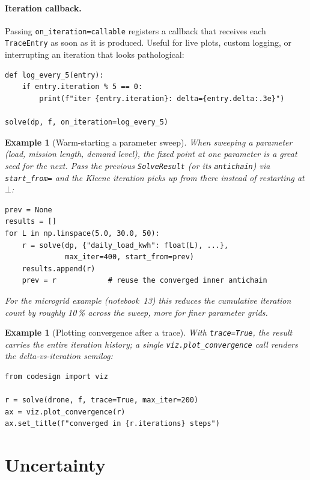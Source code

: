 \documentclass[11pt,a4paper]{article}
\newtheorem{example}[definition]{Example}
\begin{document}
\paragraph{Iteration callback.} Passing
\texttt{on\_iteration=callable} registers a callback that receives
each \texttt{TraceEntry} as soon as it is produced. Useful for live
plots, custom logging, or interrupting an iteration that looks
pathological:
\begin{lstlisting}
def log_every_5(entry):
    if entry.iteration % 5 == 0:
        print(f"iter {entry.iteration}: delta={entry.delta:.3e}")

solve(dp, f, on_iteration=log_every_5)
\end{lstlisting}

\begin{example}[Warm-starting a parameter sweep]
When sweeping a parameter (load, mission length, demand level), the
fixed point at one parameter is a great seed for the next. Pass the
previous \texttt{SolveResult} (or its \texttt{antichain}) via
\texttt{start\_from=} and the Kleene iteration picks up from there
instead of restarting at $\bot$:
\begin{lstlisting}
prev = None
results = []
for L in np.linspace(5.0, 30.0, 50):
    r = solve(dp, {"daily_load_kwh": float(L), ...},
              max_iter=400, start_from=prev)
    results.append(r)
    prev = r            # reuse the converged inner antichain
\end{lstlisting}
For the microgrid example (notebook~13) this reduces the cumulative
iteration count by roughly 10\,\% across the sweep, more for finer
parameter grids.
\end{example}

\begin{example}[Plotting convergence after a trace]
With \texttt{trace=True}, the result carries the entire iteration
history; a single \texttt{viz.plot\_convergence} call renders the
delta-vs-iteration semilog:
\begin{lstlisting}
from codesign import viz

r = solve(drone, f, trace=True, max_iter=200)
ax = viz.plot_convergence(r)
ax.set_title(f"converged in {r.iterations} steps")
\end{lstlisting}
\end{example}

\section{Uncertainty}
\label{sec:uncertainty}
\end{document}
